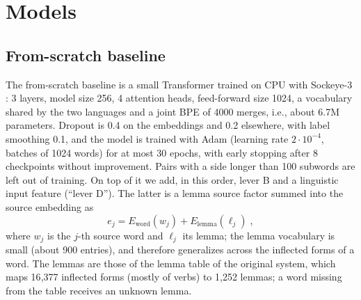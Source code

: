 \documentclass[11pt,a4paper]{article}
\begin{document}


\section{Models}
\label{sec:models}
\subsection{From-scratch baseline}
The from-scratch baseline is a small Transformer trained on CPU with Sockeye-3
\citep{hieber2017sockeye}: 3 layers, model size 256, 4 attention heads, feed-forward size 1024,
a vocabulary shared by the two languages and a joint BPE of 4000 merges, i.e., about 6.7M
parameters. Dropout is 0.4 on the embeddings and 0.2 elsewhere, with label smoothing 0.1, and the model is trained with Adam (learning rate $2\cdot 10^{-4}$, batches of 1024 words) for at most 30
epochs, with early stopping after 8 checkpoints without improvement. Pairs with a side longer than 100 subwords are left out of training. On top of it we add, in this
order, lever B and a linguistic input feature (``lever D''). The latter is a
lemma source factor \citep{sennrich2016linguistic} summed into the source embedding as
\[
  e_j=E_{\text{word}}(w_j)+E_{\text{lemma}}(\ell_j) \; ,
\]
where $w_j$ is the $j$-th source word and $\ell_j$ its lemma; the lemma vocabulary is small
(about 900 entries), and therefore generalizes across the inflected forms of a word.
The lemmas are those of the lemma table of the original system, which maps 16{,}377 inflected
forms (mostly of verbs) to 1{,}252 lemmas; a word missing from the table receives an unknown lemma.
\end{document}
